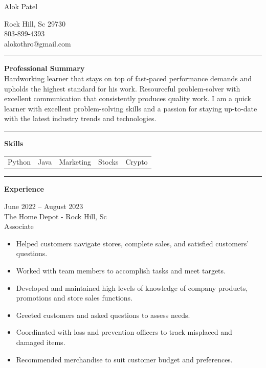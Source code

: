 \documentclass[11pt, letterpaper]{article}
\begin{document}
\begin{minipage}[t]{0.55\textwidth}
  {\fontsize{26}{30}\selectfont Alok \hspace{4pt} Patel}
\end{minipage}%
\begin{minipage}[t]{0.45\textwidth}
  \raggedleft
  Rock Hill, Sc 29730\\
  803-899-4393\\
  alokothro@gmail.com
\end{minipage}

\vspace{6pt}
\hrule
\vspace{4pt}

\textbf{\large Professional Summary}\\[4pt]
Hardworking learner that stays on top of fast-paced performance demands and upholds the highest
standard for his work. Resourceful problem-solver with excellent communication that consistently
produces quality work. I am a quick learner with excellent problem-solving skills and a passion for
staying up-to-date with the latest industry trends and technologies.

\vspace{4pt}
\hrule
\vspace{4pt}

\textbf{\large Skills}\\[4pt]
\begin{tabularx}{\textwidth}{X X X X X}
  Python & Java & Marketing & Stocks & Crypto
\end{tabularx}

\vspace{4pt}
\hrule
\vspace{4pt}

\textbf{\large Experience}

\vspace{4pt}
June 2022 -- August 2023\\
The Home Depot - Rock Hill, Sc\\
Associate
\begin{itemize}[leftmargin=1.5em, itemsep=1pt, topsep=2pt]
  \item Helped customers navigate stores, complete sales, and satisfied customers' questions.
  \item Worked with team members to accomplish tasks and meet targets.
  \item Developed and maintained high levels of knowledge of company products, promotions and store sales functions.
  \item Greeted customers and asked questions to assess needs.
  \item Coordinated with loss and prevention officers to track misplaced and damaged items.
  \item Recommended merchandise to suit customer budget and preferences.
\end{itemize}
\end{document}
